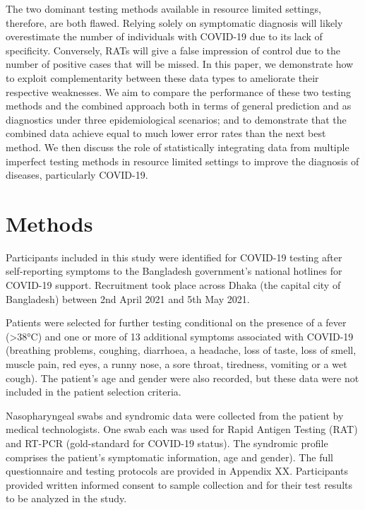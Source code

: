 \documentclass[]{elsarticle} %
\begin{document}
The two dominant testing methods available in resource limited settings,
therefore, are both flawed. Relying solely on symptomatic diagnosis will
likely overestimate the number of individuals with COVID-19 due to its
lack of specificity. Conversely, RATs will give a false impression of
control due to the number of positive cases that will be missed. In this
paper, we demonstrate how to exploit complementarity between these data
types to ameliorate their respective weaknesses. We aim to compare the
performance of these two testing methods and the combined approach both
in terms of general prediction and as diagnostics under three
epidemiological scenarios; and to demonstrate that the combined data
achieve equal to much lower error rates than the next best method. We
then discuss the role of statistically integrating data from multiple
imperfect testing methods in resource limited settings to improve the
diagnosis of diseases, particularly COVID-19.

\hypertarget{methods}{%
\section{Methods}\label{methods}}

Participants included in this study were identified for COVID-19 testing
after self-reporting symptoms to the Bangladesh government's national
hotlines for COVID-19 support. Recruitment took place across Dhaka (the
capital city of Bangladesh) between 2nd April 2021 and 5th May 2021.

Patients were selected for further testing conditional on the presence
of a fever (\textgreater38°C) and one or more of 13 additional symptoms
associated with COVID-19 (breathing problems, coughing, diarrhoea, a
headache, loss of taste, loss of smell, muscle pain, red eyes, a runny
nose, a sore throat, tiredness, vomiting or a wet cough). The patient's
age and gender were also recorded, but these data were not included in
the patient selection criteria.

Nasopharyngeal swabs and syndromic data were collected from the patient
by medical technologists. One swab each was used for Rapid Antigen
Testing (RAT) and RT-PCR (gold-standard for COVID-19 status). The
syndromic profile comprises the patient's symptomatic information, age
and gender). The full questionnaire and testing protocols are provided
in Appendix XX. Participants provided written informed consent to sample
collection and for their test results to be analyzed in the study.
\end{document}
